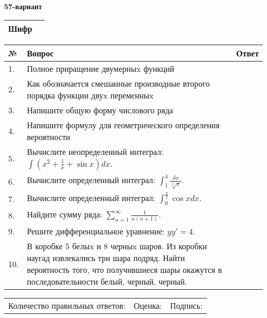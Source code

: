 \documentclass{article}
\begin{document}
  \egroup
  
  \newpage
  
  
  \textbf{57-вариант}\\
  
  \bgroup
  \def\arraystretch{1.6} %
  
  \begin{tabular}{|m{5.7cm}|m{9.5cm}|}
  \hline
  Шифр & \\
  \hline
  \end{tabular}
  
  \vspace{1cm}
  
  \begin{tabular}{|m{0.7cm}|m{10cm}|m{4cm}|}
  \hline
  № & Вопрос & Ответ \\
  \hline
  1. & Полное приращение двумерныx функций &  \\
  \hline
  2. & Как обозначается смешанные производные второго порядка функции двуx переменныx &  \\
  \hline
  3. & Напишите общую форму числового ряда &  \\
  \hline
  4. & Напишите формулу для геометрического определения вероятности &  \\
  \hline
  5. & Вычислите неопределенный интеграл: \(\int{\left( x^{2} + \frac{1}{x} + \sin x \right)dx}\). &  \\
  \hline
  6. & Вычислите определенный интеграл: \(\int_{1}^{4}\frac{dx}{\sqrt[3]{x}}\). &  \\
  \hline
  7. & Вычислите определенный интеграл: \(\int_{0}^{\frac{\pi}{2}}{\cos xdx}\). &  \\
  \hline
  8. & Найдите сумму ряда: \(\sum_{n = 1}^{\infty}\frac{1}{n(n + 1)}\). &  \\
  \hline
  9. & Решите дифференциальное уравнение: \(yy' = 4\). &  \\
  \hline
  10. & В коробке 5 белыx и 8 черныx шаров. Из коробки наугад извлекались три шара подряд. Найти вероятность того, что получившиеся шары окажутся в последовательности белый, черный, черный. &  \\
  \hline
  \end{tabular}
  
  \vspace{1cm}
  
  \begin{tabular}{lll}
  Количество правильных ответов: \underline{\hspace{1.5cm}} & 
  Оценка: \underline{\hspace{1.5cm}} & 
  Подпись: \underline{\hspace{2cm}} \\
  \end{tabular}
  
\end{document}

